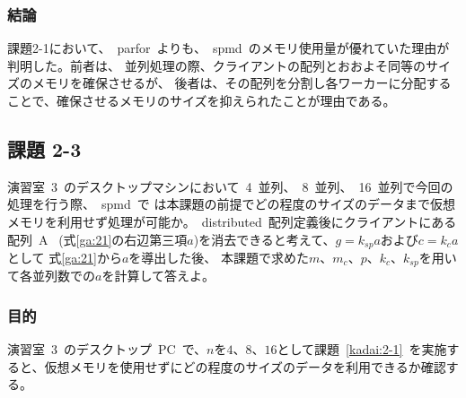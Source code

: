\documentclass[10pt]{jarticle}
\begin{document}
\subsubsection{結論}
%
課題2-1において、\ parfor\ よりも、\ spmd\ のメモリ使用量が優れていた理由が判明した。前者は、
並列処理の際、クライアントの配列とおおよそ同等のサイズのメモリを確保させるが、
後者は、その配列を分割し各ワーカーに分配することで、確保させるメモリのサイズを抑えられたことが理由である。
%

\subsection{課題 2-3}
演習室\ 3\ のデスクトップマシンにおいて\ 4\ 並列、\ 8\ 並列、\ 16\ 並列で今回の処理を行う際、\ spmd\ で
は本課題の前提でどの程度のサイズのデータまで仮想メモリを利用せず処理が可能か。\ distributed\ 配列定義後にクライアントにある
配列\ A \ (式\ref{ga:21}の右辺第三項$ a $)を消去できると考えて、$g = k_{sp}a$および$c = k_{c}a$として
式\ref{ga:21}から$ a $を導出した後、 本課題で求めた$ m、m_{c}、p、k_{c}、k_{sp} $を用いて各並列数での$ a $を計算して答えよ。
\subsubsection{目的}
%
演習室\ 3\ のデスクトップ\ PC\ で、$ n $を$ 4、8、16 $として課題\ \ref{kadai:2-1}\ 
を実施すると、仮想メモリを使用せずにどの程度のサイズのデータを利用できるか確認する。
%
\end{document}
